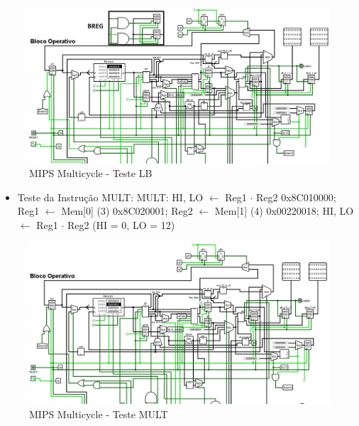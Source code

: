 \documentclass{report}
\begin{document}
        \begin{figure}[h!]
            \centering
            \includegraphics[width=\linewidth]{images/prints/Multicycle/Teste LB.png}
            \caption{\label{print:multicycle_test_LB} MIPS Multicycle - Teste LB}
        \end{figure}

        \begin{itemize}
            \item Teste da Instrução MULT:
                \subitem MULT: HI, LO $\leftarrow$ Reg1 $\cdot$ Reg2
                \subitem 0x8C010000; Reg1 $\leftarrow$ Mem[0] (3)
                \subitem 0x8C020001; Reg2 $\leftarrow$ Mem[1] (4)
                \subitem 0x00220018; HI, LO $\leftarrow$ Reg1 $\cdot$ Reg2 (HI = 0, LO = 12)
        \end{itemize}

        \begin{figure}[h!]
            \centering
            \includegraphics[width=\linewidth]{images/prints/Multicycle/Teste MULT.png}
            \caption{\label{print:multicycle_test_MULT} MIPS Multicycle - Teste MULT}
        \end{figure}
\end{document}
